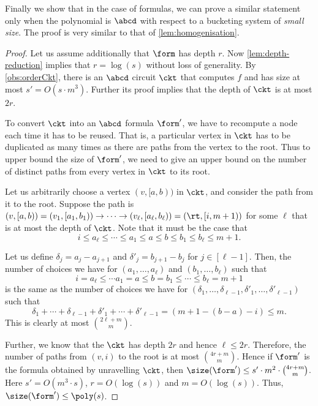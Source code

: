 Finally we show that in the case of formulas, we can prove a similar statement only when the polynomial is $\abcd$ with respect to a bucketing system of \emph{small size}.
The proof is very similar to that of \autoref{lem:homogenisation}.

\orderForm*

\begin{proof}
	Let us assume additionally that $\form$ has depth $r$. 
	Now \autoref{lem:depth-reduction} implies that $r = \log(s)$ without loss of generality.
	By \autoref{obs:orderCkt}, there is an $\abcd$ circuit $\ckt$ that computes $f$ and has size at most $s' = O(s \cdot m^3)$. 
	Further its proof implies that the depth of $\ckt$ is at most $2r$.
	
	To convert $\ckt$ into an $\abcd$ formula $\form'$, we have to recompute a node each time it has to be reused. 
	That is, a particular vertex in $\ckt$ has to be duplicated as many times as there are paths from the vertex to the root. 
	Thus to upper bound the size of $\form'$, we need to give an upper bound on the number of distinct paths from every vertex in $\ckt$ to its root.
	
	Let us arbitrarily choose a vertex $(v,[a,b))$ in $\ckt$, and consider the path from it to the root.
	Suppose the path is $(v,[a,b)) = (v_1, [a_1, b_1)) \rightarrow \cdots \rightarrow (v_\ell, [a_\ell, b_\ell)) = (\rt, [i, m+1))$ for some $\ell$ that is at most the depth of $\ckt$. 
	Note that it must be the case that 
	\[
		i \leq a_\ell \leq \cdots \leq a_1 \leq a \leq b \leq b_1 \leq b_\ell \leq m+1.
	\]

	Let us define $\delta_j = a_{j} - a_{j+1}$ and $\delta'_{j} = b_{j+1} - b_{j}$ for $j \in [\ell - 1]$. 
	Then, the number of choices we have for $(a_1, \ldots, a_\ell)$ and $(b_1, \ldots, b_\ell)$ such that 
	\[
		i = a_\ell \leq \cdots a_1 = a \leq b = b_1 \leq \cdots \leq b_\ell = m+1
	\]
	is the same as the number of choices we have for $(\delta_1, \ldots, \delta_{\ell-1}, \delta'_1, \ldots, \delta'_{\ell - 1})$ such that 
	\[
		\delta_1 + \cdots + \delta_{\ell - 1} + \delta'_1 + \cdots + \delta'_{\ell - 1} = (m+1 - (b-a) - i) \leq m.	
	\] 
	This is clearly at most ${2\ell + m}\choose{m}$.
	
	Further, we know that the $\ckt$ has depth $2r$ and hence $\ell \leq 2r$. 
	Therefore, the number of paths from $(v, i)$ to the root is at most $4r + m \choose m$. 
	Hence if $\form'$ is the formula obtained by unravelling $\ckt$, then $\size(\form') \leq s' \cdot m^2 \cdot {4r + m \choose m}$.	
	Here $s'  = O(m^3 \cdot s)$, $r = O(\log(s))$ and $m = O(\log(s))$.
	Thus, $\size(\form') \leq \poly(s)$.
\end{proof}
